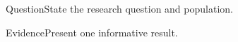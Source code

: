 \documentclass{beamer}
\begin{document}
\begin{frame}{Question}State the research question and population.\end{frame}
\begin{frame}{Evidence}Present one informative result.\end{frame}
\end{document}
